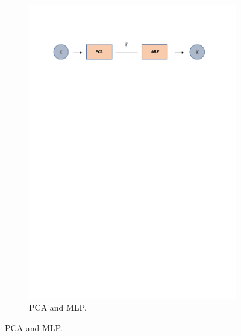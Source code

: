 \documentclass[12pt]{report}
\begin{document}
\begin{figure}[H]
\begin{subfigure}{1\linewidth}  
 \centering
  \includegraphics[width=\linewidth]{Figuras_tfg/Diagram_pca_mlp}
  \caption{PCA and MLP.}
  \label{fig:FigA_PCA_MLP} 
\end{subfigure}


\end{figure}
\end{document}
